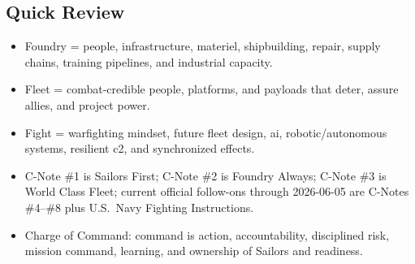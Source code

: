 \documentclass[../main.tex]{subfiles}
\begin{document}
\subsection{Quick Review}
\begin{itemize}
  \item Foundry = people, infrastructure, materiel, shipbuilding, repair, supply chains, training pipelines, and industrial capacity.
  \item Fleet = combat-credible people, platforms, and payloads that deter, assure allies, and project power.
  \item Fight = warfighting mindset, future fleet design, \ac{ai}, robotic/autonomous systems, resilient \ac{c2}, and synchronized effects.
  \item C-Note \#1 is Sailors First; C-Note \#2 is Foundry Always; C-Note \#3 is World Class Fleet; current official follow-ons through 2026-06-05 are C-Notes \#4--\#8 plus U.S.\ Navy Fighting Instructions.
  \item Charge of Command: command is action, accountability, disciplined risk, mission command, learning, and ownership of Sailors and readiness.
\end{itemize}

\end{document}
